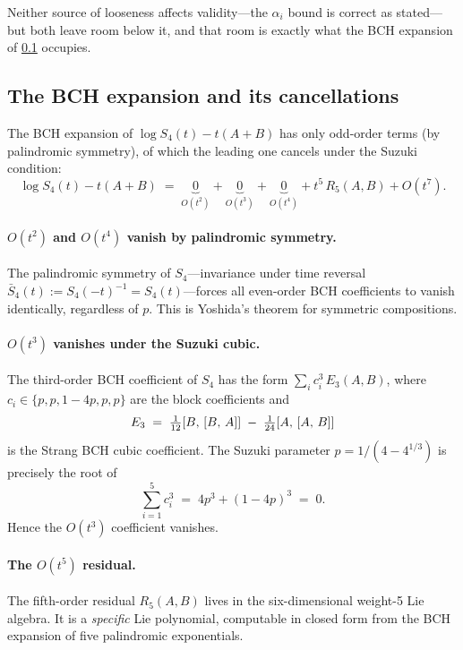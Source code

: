 Neither source of looseness affects validity---the $\alpha_i$ bound is
correct as stated---but both leave room below it, and that room is exactly
what the BCH expansion of \cref{sec:bch-expansion} occupies.

\subsection{The BCH expansion and its cancellations}
\label{sec:bch-expansion}

The BCH expansion of $\log S_4(t) - t(A+B)$ has only odd-order terms (by
palindromic symmetry), of which the leading one cancels under the Suzuki
condition:
\begin{equation}\label{eq:log-s4}
  \log S_4(t) - t(A+B) \;=\; \underbrace{0}_{O(t^2)} + \underbrace{0}_{O(t^3)}
  + \underbrace{0}_{O(t^4)} + t^5\,R_5(A,B) + O(t^7).
\end{equation}

\paragraph{$O(t^2)$ and $O(t^4)$ vanish by palindromic symmetry.}
The palindromic symmetry of $S_4$---invariance under time reversal
$\bar S_4(t) := S_4(-t)^{-1} = S_4(t)$---forces all even-order BCH
coefficients to vanish identically, regardless of $p$. This is Yoshida's
theorem for symmetric compositions.

\paragraph{$O(t^3)$ vanishes under the Suzuki cubic.}
The third-order BCH coefficient of $S_4$ has the form
$\sum_i c_i^3\, E_3(A,B)$, where $c_i \in \{p, p, 1{-}4p, p, p\}$ are the
block coefficients and
\begin{equation}\label{eq:E3}
  E_3 \;=\; \tfrac{1}{12}[B,\,[B,\,A]] \;-\; \tfrac{1}{24}[A,\,[A,\,B]]
\end{equation}
is the Strang BCH cubic coefficient. The Suzuki parameter $p = 1/(4-4^{1/3})$ is
precisely the root of
\begin{equation}
  \sum_{i=1}^{5} c_i^3 \;=\; 4p^3 + (1-4p)^3 \;=\; 0.
\end{equation}
Hence the $O(t^3)$ coefficient vanishes.

\paragraph{The $O(t^5)$ residual.}
The fifth-order residual $R_5(A,B)$ lives in the six-dimensional weight-5
Lie algebra. It is a \emph{specific} Lie polynomial, computable in closed
form from the BCH expansion of five palindromic exponentials.

